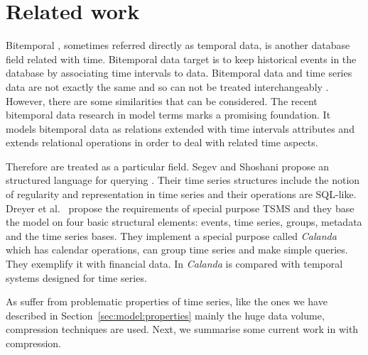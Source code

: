 

\section{Related work}
\label{sec:related-work}

Bitemporal , sometimes referred directly as temporal data,
is another database field related with time. Bitemporal data target is
to keep historical events in the database by associating time
intervals to data.  Bitemporal data and time series data are not
exactly the same and so can not be treated interchangeably
\cite{schmidt95}. However, there are some similarities that can be
considered.  The recent bitemporal data research in  model
terms \cite{jensen99:temporaldata,date02:_tempor_data_relat_model}
marks a promising foundation. It models bitemporal data as relations
extended with time intervals attributes and extends relational
operations in order to deal with related time aspects.


Therefore  are treated as a particular 
field.  Segev and Shoshani \cite{segev87:sigmod} propose an structured
language for querying . Their time series structures
include the notion of regularity and representation in time series and
their operations are SQL-like.  Dreyer et al.\ \cite{dreyer94} propose
the requirements of special purpose TSMS and they base the model on
four basic structural elements: events, time series, groups, metadata
and the time series bases. They implement a special purpose
 called \emph{Calanda} which has calendar operations, can
group time series and make simple queries. They exemplify it with
financial data. In \cite{schmidt95} \emph{Calanda} is compared with
temporal systems designed for time series.




As  suffer from problematic properties of time
series, like the ones we have described in
Section~\ref{sec:model:properties} mainly the huge data volume,
compression techniques are used.  Next, we summarise some current work
in  with compression.



